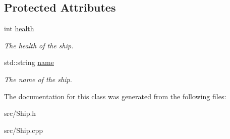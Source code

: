 \subsection*{Protected Attributes}
\begin{DoxyCompactItemize}
\item 
\hypertarget{class_ship_a110781c5f23a8c9a9cfc010601ea32b8}{}int \hyperlink{class_ship_a110781c5f23a8c9a9cfc010601ea32b8}{health}\label{class_ship_a110781c5f23a8c9a9cfc010601ea32b8}

\begin{DoxyCompactList}\small\item\em The health of the ship. \end{DoxyCompactList}\item 
\hypertarget{class_ship_a2e1ec44d8edcfc20d8d580f95fd6af75}{}std\+::string \hyperlink{class_ship_a2e1ec44d8edcfc20d8d580f95fd6af75}{name}\label{class_ship_a2e1ec44d8edcfc20d8d580f95fd6af75}

\begin{DoxyCompactList}\small\item\em The name of the ship. \end{DoxyCompactList}\end{DoxyCompactItemize}


The documentation for this class was generated from the following files\+:\begin{DoxyCompactItemize}
\item 
src/Ship.\+h\item 
src/Ship.\+cpp\end{DoxyCompactItemize}
